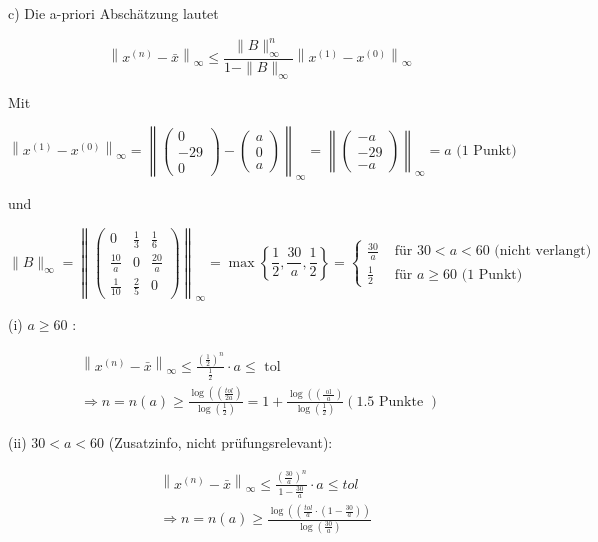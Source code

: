 \documentclass[10pt]{article}
\begin{document}
c) Die a-priori Abschätzung lautet

$$
\left\|x^{(n)}-\bar{x}\right\|_{\infty} \leq \frac{\|B\|_{\infty}^{n}}{1-\|B\|_{\infty}}\left\|x^{(1)}-x^{(0)}\right\|_{\infty}
$$

Mit

$$
\left\|x^{(1)}-x^{(0)}\right\|_{\infty}=\left\|\left(\begin{array}{c}
0 \\
-29 \\
0
\end{array}\right)-\left(\begin{array}{c}
a \\
0 \\
a
\end{array}\right)\right\|_{\infty}=\left\|\left(\begin{array}{c}
-a \\
-29 \\
-a
\end{array}\right)\right\|_{\infty}=a \text { (1 Punkt) }
$$

und

$$
\|B\|_{\infty}=\left\|\left(\begin{array}{ccc}
0 & \frac{1}{3} & \frac{1}{6} \\
\frac{10}{a} & 0 & \frac{20}{a} \\
\frac{1}{10} & \frac{2}{5} & 0
\end{array}\right)\right\|_{\infty}=\max \left\{\frac{1}{2}, \frac{30}{a}, \frac{1}{2}\right\}= \begin{cases}\frac{30}{a} & \text { für } 30<a<60 \text { (nicht verlangt) } \\
\frac{1}{2} & \text { für } a \geq 60 \text { (1 Punkt) }\end{cases}
$$

(i) $a \geq 60$ :

$$
\begin{gathered}
\left\|x^{(n)}-\bar{x}\right\|_{\infty} \leq \frac{\left(\frac{1}{2}\right)^{n}}{\frac{1}{2}} \cdot a \leq \text { tol } \\
\Rightarrow n=n(a) \geq \frac{\log \left(\left(\frac{t o l}{2 a}\right)\right.}{\log \left(\frac{1}{2}\right)}=1+\frac{\log \left(\left(\frac{\text { ol }}{a}\right)\right.}{\log \left(\frac{1}{2}\right)}(1.5 \text { Punkte })
\end{gathered}
$$

(ii) $30<a<60$ (Zusatzinfo, nicht prüfungsrelevant):

$$
\begin{aligned}
& \left\|x^{(n)}-\bar{x}\right\|_{\infty} \leq \frac{\left(\frac{30}{a}\right)^{n}}{1-\frac{30}{a}} \cdot a \leq t o l \\
& \Rightarrow n=n(a) \geq \frac{\log \left(\left(\frac{t o l}{a} \cdot\left(1-\frac{30}{a}\right)\right)\right.}{\log \left(\frac{30}{a}\right)}
\end{aligned}
$$
\end{document}
